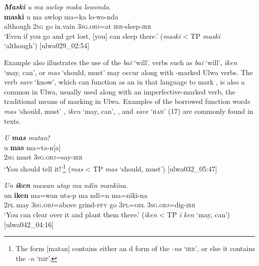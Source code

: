 \ea%
    \label{ex:loss:14}
          \textit{\textbf{Maski} u ma awlop maka lowonda.}\\
\gll    \textbf{maski}     u    ma  awlop  ma=ka      lo-wo-nda\\
    although  \textsc{2sg}  go  in.vain  3\textsc{sg.obj}=at  \textsc{irr}{}-sleep-\textsc{irr}\\
\glt `Even if you go and get lost, [you] can sleep there.’ (\textit{maski} < TP \textit{maski} ‘although’) [ulwa029\_02:54]
\z

Example  also illustrates the use of the   \textit{bai} ‘will’.   verbs such as \textit{bai} ‘will’, \textit{iken} ‘may, can’, or \textit{mas} ‘should, must’ may occur along with -marked Ulwa verbs. The  verb \textit{save} \linebreak ‘know’, which can function as an  in that language to mark  \linebreak {}, is also a common  in Ulwa, usually used along with an \linebreak imperfective-marked verb, the traditional means of marking   in Ulwa. Examples of the borrowed  function words \textit{mas} ‘should, must’ , \textit{iken} ‘may, can’, , and \textit{save} ‘\textsc{hab’} \textsc{(1}7) are commonly found in texts.

\ea%
    \label{ex:loss:15}
          \textit{U \textbf{mas} matan!}\\
\gll    u    \textbf{mas}  ma=ta-n[a]\\
    2\textsc{sg}  must  3\textsc{sg.obj}=say-\textsc{irr}\\
\glt `You should tell it!’\footnote{The form [matan] contains either an d form of the   \textit{-na} ‘\textsc{irr}’, or else it contains the   \textit{-n} ‘\textsc{imp}’.} (\textit{mas} < TP \textit{mas} ‘should, must’) [ulwa032\_05:47]
\z

\ea%
    \label{ex:loss:16}
          \textit{Un \textbf{iken} mawan utap ma ndïn mankïna.}\\
\gll    un  \textbf{iken}  ma=wan      uta-p    ma  ndï=n ma=nïkï-na\\
    2\textsc{pl}  may  3\textsc{sg.obj=}above  grind-\textsc{pfv}  go  3\textsc{pl=obl}    3\textsc{sg.obj}=dig-\textsc{irr}\\
\glt `You can clear over it and plant them there.’ (\textit{iken} < TP \textit{i ken} ‘may, can’) [ulwa042\_04:16]
\z

